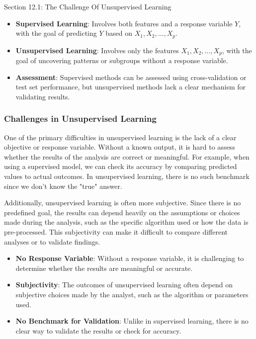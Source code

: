 \begin{notes}{Section 12.1: The Challenge Of Unsupervised Learning}
    \begin{highlight}
        \begin{itemize}
            \item \textbf{Supervised Learning}: Involves both features and a response variable \(Y\), with the goal of predicting \(Y\) based on \(X_1, X_2, \dots, X_p\).
            \item \textbf{Unsupervised Learning}: Involves only the features \(X_1, X_2, \dots, X_p\), with the goal of uncovering patterns or subgroups without a response variable.
            \item \textbf{Assessment}: Supervised methods can be assessed using cross-validation or test set performance, but unsupervised methods lack a clear mechanism for validating results.
        \end{itemize}
    \end{highlight}
    
    \subsubsection*{Challenges in Unsupervised Learning}
    
    One of the primary difficulties in unsupervised learning is the lack of a clear objective or response variable. Without a known output, it is hard to assess whether the results of the analysis are correct 
    or meaningful. For example, when using a supervised model, we can check its accuracy by comparing predicted values to actual outcomes. In unsupervised learning, there is no such benchmark since we don’t 
    know the "true" answer.
    
    Additionally, unsupervised learning is often more subjective. Since there is no predefined goal, the results can depend heavily on the assumptions or choices made during the analysis, such as the specific 
    algorithm used or how the data is pre-processed. This subjectivity can make it difficult to compare different analyses or to validate findings.
    
    \begin{highlight}
        \begin{itemize}
            \item \textbf{No Response Variable}: Without a response variable, it is challenging to determine whether the results are meaningful or accurate.
            \item \textbf{Subjectivity}: The outcomes of unsupervised learning often depend on subjective choices made by the analyst, such as the algorithm or parameters used.
            \item \textbf{No Benchmark for Validation}: Unlike in supervised learning, there is no clear way to validate the results or check for accuracy.
        \end{itemize}
    \end{highlight}
    

\end{notes}
